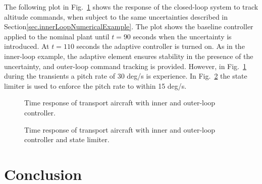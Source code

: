 The following plot in Fig.~\ref{fig.outerLoopTransportLong} shows the response of the closed-loop system to track altitude commands, when subject to the same uncertainties described in Section\ref{sec.innerLoopNumericalExample}.
The plot shows the baseline controller applied to the nominal plant until $t=90$ seconds when the uncertainty is introduced.
At $t=110$ seconds the adaptive controller is turned on.
As in the inner-loop example, the adaptive element ensures stability in the presence of the uncertainty, and outer-loop command tracking is provided.
However, in Fig.~\ref{fig.outerLoopTransportLong} during the transients a pitch rate of 30 deg/s is experience.
In Fig.~\ref{fig.outerLoopStateLimiterTransportLong} the state limiter is used to enforce the pitch rate to within 15 deg/s.

\newpage
\begin{figure}[H]
  \hspace{-0.0in}
  \noindent{}
  \vspace{-0.95in}
  \caption{Time response of transport aircraft with inner and outer-loop controller.\label{fig.outerLoopTransportLong}}
\end{figure}

\newpage
\begin{figure}[H]
  \hspace{-0.0in}
  \noindent{}
  \vspace{-0.95in}
  \caption{Time response of transport aircraft with inner and outer-loop controller and state limiter.\label{fig.outerLoopStateLimiterTransportLong}}
\end{figure}

\section{Conclusion}

